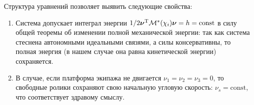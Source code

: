 Структура уравнений позволяет выявить следующие свойства:
\begin{enumerate}
    \item Система допускает интеграл энергии $1/2 \boldsymbol{\mathbf{\nu}}^\mathrm{T}\mathcal{M}^*(\chi_i)\boldsymbol{\mathbf{\nu}} = h = \mathrm{const}$ в силу общей теоремы об изменении полной механической энергии: так как система стеснена автономными идеальными связями, а силы консервативны, то полная энергия (в нашем случае она равна кинетической энергии) сохраняется.
    
    \item В случае, если платформа экипажа не двигается $\nu_1 = \nu_2 = \nu_3 = 0$, то свободные ролики сохраняют свою начальную угловую скорость: $\nu_s = \mathrm{const}$, что соответствует здравому смыслу. 
   

\end{enumerate}
